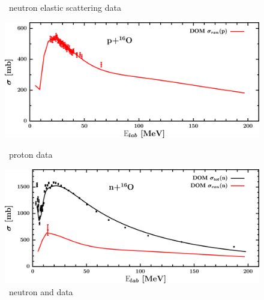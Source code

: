 \begin{figure}[H]
\begin{minipage}{0.45\textwidth}
        \caption{\oSix\ neutron elastic scattering data}
        \label{DOMFitData_o16_neutron_elastic}
    \end{minipage}
\end{figure}

\begin{figure}[H]
    \centering
    \begin{minipage}{0.45\textwidth}
        \centering
        \includegraphics[width=1.0\textwidth]{figures/o16_protonInelastic.png}
        \caption{\oSix\ proton \rxn data}
        \label{DOMFitData_o16_proton_inelastic}
    \end{minipage}\hfill
    \begin{minipage}{0.45\textwidth}
        \centering
        \includegraphics[width=1.0\textwidth]{figures/o16_neutronInelastic.png}
        \caption{\oSix\ neutron \rxn and \tot data}
        \label{DOMFitData_o16_neutron_inelastic}
    \end{minipage}
\end{figure}

\afterpage{\clearpage}

